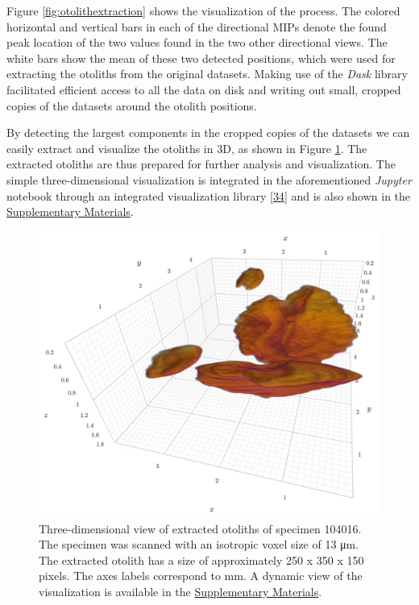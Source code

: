 Figure \ref{fig:otolithextraction} shows the visualization of the process.
The colored horizontal and vertical bars in each of the directional MIPs denote the found peak location of the two values found in the two other directional views.
The white bars show the mean of these two detected positions, which were used for extracting the otoliths from the original datasets.
Making use of the \emph{Dask} library facilitated efficient access to all the data on disk and writing out small, cropped copies of the datasets around the otolith positions.

By detecting the largest components in the cropped copies of the datasets we can easily extract and visualize the otoliths in 3D, as shown in Figure \ref{fig:otolith3d}.
The extracted otoliths are thus prepared for further analysis and visualization.
The simple three-dimensional visualization is integrated in the aforementioned \emph{Jupyter} notebook through an integrated visualization library {[}\protect\hyperlink{ref-a9ZL41Of}{34}{]} and is also shown in the \protect\hyperlink{supplementary-materials}{Supplementary Materials}.

\begin{figure}
\hypertarget{fig:otolith3d}{%
\centering
\includegraphics{images/104016.head.rec.otolith.region.3D.png}
\caption{Three-dimensional view of extracted otoliths of specimen 104016.
The specimen was scanned with an isotropic voxel size of 13 μm.
The extracted otolith has a size of approximately 250 x 350 x 150 pixels.
The axes labels correspond to mm.
A dynamic view of the visualization is available in the \protect\hyperlink{supplementary-materials}{Supplementary Materials}.}\label{fig:otolith3d}
}
\end{figure}

